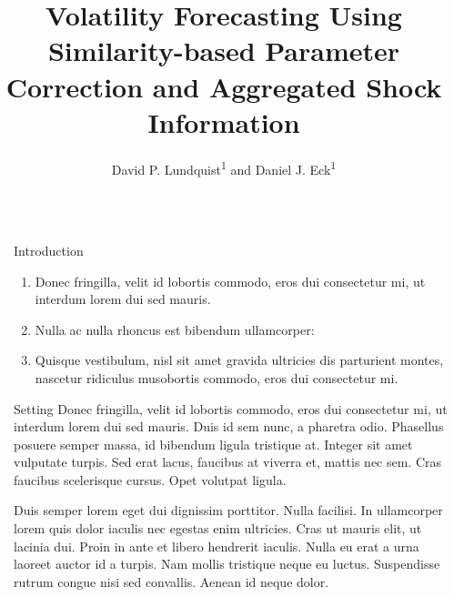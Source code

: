 \documentclass{beamer} %
\title{\LARGE Volatility Forecasting Using Similarity-based Parameter Correction and Aggregated Shock Information} %
\author{David P. Lundquist\textsuperscript{1} and Daniel J. Eck\textsuperscript{1}} %
\institute{\textsuperscript{1}Department of Statistics, University of Illinois Urbana-Champaign} %
\begin{document}
\begin{frame}[t] %

\begin{columns}[t] %

\begin{column}{0.02\textwidth}\end{column} %

\begin{column}{0.465\textwidth} %


\begin{block}{Introduction}
	\begin{enumerate}
		\item Donec fringilla, velit id lobortis commodo, eros dui consectetur mi, ut interdum lorem dui sed mauris.
		\item Nulla ac nulla rhoncus est bibendum ullamcorper:
		\item Quisque vestibulum, nisl sit amet gravida ultricies dis parturient montes, nascetur ridiculus musobortis commodo, eros dui consectetur mi.
	\end{enumerate}
\end{block}

            
\begin{block}{Setting}
	Donec fringilla, velit id lobortis commodo, eros dui consectetur mi, ut interdum lorem dui sed mauris. Duis id sem nunc, a pharetra odio. Phasellus posuere \alert{semper massa}, id bibendum ligula tristique at. Integer sit amet vulputate turpis. Sed erat lacus, faucibus at viverra et, mattis nec sem. Cras faucibus scelerisque cursus. Opet volutpat ligula.
	
	\bigskip %
	
	Duis semper lorem eget dui dignissim porttitor. \alert{Nulla facilisi.} In ullamcorper lorem quis dolor iaculis nec egestas enim ultricies. Cras ut mauris elit, ut lacinia dui. Proin in ante et libero hendrerit iaculis. Nulla eu erat a urna laoreet auctor id a turpis. Nam mollis tristique neque eu luctus. Suspendisse rutrum congue nisi sed convallis. Aenean id neque dolor.
\end{block}


\end{column}
\end{columns}
\end{frame}
\end{document}
